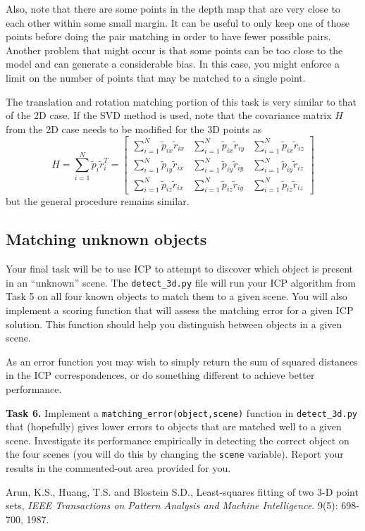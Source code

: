 \documentclass[a4paper,11pt]{article}
\begin{document}
Also, note that there are some points in the depth map that are very close to
each other within some small margin. It can be useful to only keep one of those
points before doing the pair matching in order to have fewer possible
pairs. Another problem that might occur is that some points can be too close to
the model and can generate a considerable bias. In this case, you might enforce
a limit on the number of points that may be matched to a single point.

The translation and rotation matching portion of this task is very similar to that
of the 2D case.  If the SVD method is used, note that the covariance matrix $H$ from the 2D case
needs to be modified for the 3D points as
\begin{equation*}
  H = \sum_{i=1}^{N} \tilde{p}_i\tilde{r}_i^T = 
  \begin{bmatrix}
    \sum_{i=1}^{N} \tilde{p}_{ix}\tilde{r}_{ix} &
    \sum_{i=1}^{N} \tilde{p}_{ix}\tilde{r}_{iy} &
    \sum_{i=1}^{N} \tilde{p}_{ix}\tilde{r}_{iz} \\
    \sum_{i=1}^{N} \tilde{p}_{iy}\tilde{r}_{ix} &
    \sum_{i=1}^{N} \tilde{p}_{iy}\tilde{r}_{iy} &
    \sum_{i=1}^{N} \tilde{p}_{iy}\tilde{r}_{iz} \\
    \sum_{i=1}^{N} \tilde{p}_{iz}\tilde{r}_{ix} &
    \sum_{i=1}^{N} \tilde{p}_{iz}\tilde{r}_{iy} &
    \sum_{i=1}^{N} \tilde{p}_{iz}\tilde{r}_{iz} 
  \end{bmatrix}
\end{equation*}
but the general procedure remains similar. 


\subsection{Matching unknown objects}

Your final task will be to use ICP to attempt to discover which object
is present in an ``unknown'' scene.  The \texttt{detect\_3d.py} file will
run your ICP algorithm from Task 5 on all four known objects to match them
to a given scene.  You will also implement a scoring function that will
assess the matching error for a given ICP solution.  This function should
help you distinguish between objects in a given scene.

As an error function you may wish to simply return the sum of squared distances in the
ICP correspondences, or do something different to achieve better performance.

{\bf Task 6.}  Implement a \texttt{matching\_error(object,scene)} function in \texttt{detect\_3d.py} that (hopefully) gives lower errors to objects that are matched well to a given scene.   Investigate its performance empirically in detecting the correct object on the four scenes (you will do this by changing the \texttt{scene} variable).  Report your results in the
commented-out area provided for you.


\begin{thebibliography}{9}

  Arun, K.S., Huang, T.S. and Blostein S.D.,
  Least-squares fitting of two 3-D point sets, 
  \emph{IEEE Transactions on Pattern Analysis and Machine Intelligence}.
  9(5): 698-700,
  1987.
\end{thebibliography}
\end{document}
